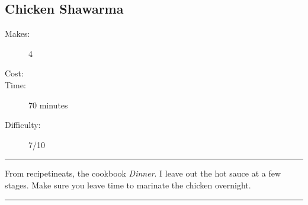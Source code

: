 \documentclass[]{article}
\begin{document}
\subsection*{\center\huge Chicken Shawarma}
\begin{description}
\item[Makes:] 4 
\item[Cost:] \textdollar
\item[Time:] 70 minutes
\item[Difficulty:] 7/10
\end{description}
\vspace{0.2cm}\hrule\vspace{0.5cm}
\begin{adjustwidth}{0.5 cm}{0.5 cm}

From recipetineats, the cookbook \textit{Dinner}. I leave out the hot sauce at a few stages. Make sure you leave time to marinate the chicken overnight. \hfill{}\color{black}

\end{adjustwidth}
\vspace{0.5cm}\hrule
\end{document}
